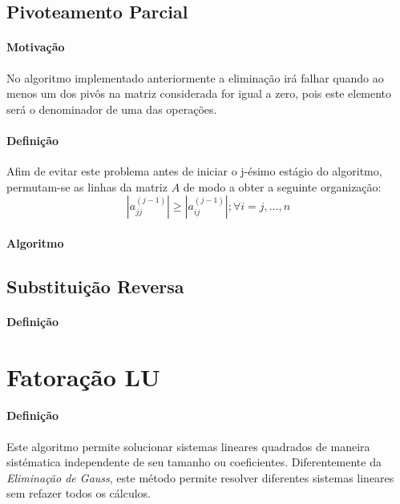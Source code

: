 \documentclass{article}
\begin{document}
        \subsection{Pivoteamento Parcial}
            \paragraph{Motivação}No algoritmo implementado anteriormente a eliminação irá falhar quando ao menos um dos pivôs na matriz considerada for igual a zero, pois este elemento será o denominador de uma das operações.

            \paragraph{Definição}Afim de evitar este problema antes de iniciar o j-ésimo estágio do algoritmo, permutam-se as linhas da matriz $A$ de modo a obter a seguinte organização:
                \[|a_{jj}^{(j-1)}|\geq|a_{ij}^{(j-1)}|; \forall i = j, \dots, n\]

            \paragraph{Algoritmo}
        
        \subsection{Substituição Reversa}
            \paragraph{Definição}
\newpage

    \section{Fatoração LU}
        \paragraph{Definição}Este algoritmo permite solucionar sistemas lineares quadrados de maneira sistématica independente de seu tamanho ou coeficientes. Diferentemente da \textit{Eliminação de Gauss}, este método permite resolver diferentes sistemas lineares sem refazer todos os cálculos.
\end{document}
